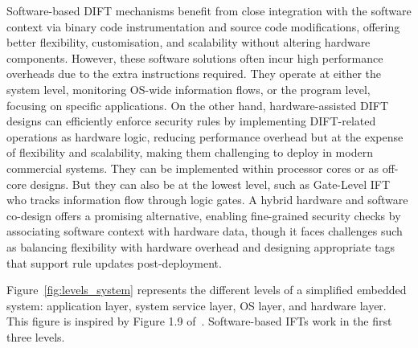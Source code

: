 Software-based DIFT mechanisms benefit from close integration with the software context via binary code instrumentation and source code modifications, offering better flexibility, customisation, and scalability without altering hardware components. However, these software solutions often incur high performance overheads due to the extra instructions required. They operate at either the system level, monitoring OS-wide information flows, or the program level, focusing on specific applications.
On the other hand, hardware-assisted DIFT designs can efficiently enforce security rules by implementing DIFT-related operations as hardware logic, reducing performance overhead but at the expense of flexibility and scalability, making them challenging to deploy in modern commercial systems. They can be implemented within processor cores or as off-core designs. But they can also be at the lowest level, such as Gate-Level IFT who tracks information flow through logic gates.
A hybrid hardware and software co-design offers a promising alternative, enabling fine-grained security checks by associating software context with hardware data, though it faces challenges such as balancing flexibility with hardware overhead and designing appropriate tags that support rule updates post-deployment.

Figure~\ref{fig:levels_system} represents the different levels of a simplified embedded system: application layer, system service layer, OS layer, and hardware layer. This figure is inspired by Figure 1.9 of~\cite{ebrary}. Software-based IFTs work in the first three levels.

